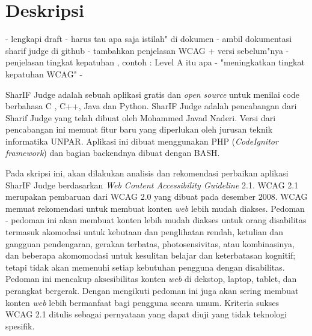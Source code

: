 \documentclass[a4paper,twoside]{article}
\begin{document}
\title{\@judultopik}
\author{\nama \textendash \@npm} 

\newcommand{\nama}{Amabel Levint}
\newcommand{\@npm}{2016730013}
\newcommand{\@judultopik}{Kepatuhan dan Rekomendasi Perbaikan Web Content Accessibility Guideline 2.1 untuk Aplikasi SharIF Judge} %
\newcommand{\jumpemb}{1} %
\newcommand{\tanggal}{01/01/1900}


\maketitle


\section{Deskripsi}
- lengkapi draft
- harus tau apa saja istilah" di dokumen
- ambil dokumentasi sharif judge di github
- tambahkan penjelasan WCAG + versi sebelum"nya
- penjelasan tingkat kepatuhan , contoh : Level A itu apa
- "meningkatkan tingkat kepatuhan WCAG"
- 

SharIF Judge adalah sebuah aplikasi gratis dan \textit{open source} untuk menilai code berbahasa C , C++, Java dan Python. SharIF Judge adalah pencabangan dari Sharif Judge yang telah dibuat oleh Mohammed Javad Naderi. Versi dari pencabangan ini memuat fitur baru yang diperlukan oleh jurusan teknik informatika UNPAR. Aplikasi ini dibuat menggunakan PHP (\textit{CodeIgnitor framework}) dan bagian backendnya dibuat dengan BASH.

Pada skripsi ini, akan dilakukan analisis dan rekomendasi perbaikan aplikasi SharIF Judge berdasarkan \textit{Web Content Accessibility Guideline} 2.1. WCAG 2.1 merupakan pembaruan dari WCAG 2.0 yang dibuat pada desember 2008. WCAG memuat rekomendasi untuk membuat konten \textit{web} lebih mudah diakses. Pedoman - pedoman ini akan membuat konten lebih mudah diakses untuk orang disabilitas termasuk akomodasi untuk kebutaan dan penglihatan rendah, ketulian dan gangguan pendengaran, gerakan terbatas, photosensivitas, atau kombinasinya, dan beberapa akomomodasi untuk kesulitan belajar dan keterbatasan kognitif; tetapi tidak akan memenuhi setiap kebutuhan pengguna dengan disabilitas. Pedoman ini mencakup aksesibilitas konten \textit{web} di dekstop, laptop, tablet, dan perangkat bergerak. Dengan mengikuti pedoman ini juga akan sering membuat konten \textit{web} lebih bermanfaat bagi pengguna secara umum. Kriteria sukses WCAG 2.1 ditulis sebagai pernyataan yang dapat diuji yang tidak teknologi spesifik. 
\end{document}
